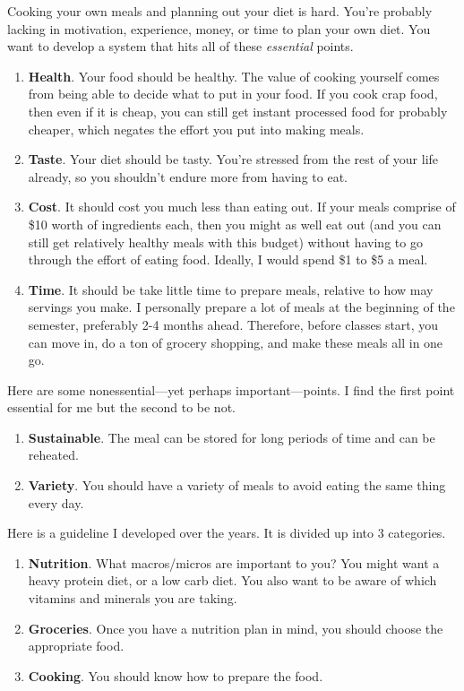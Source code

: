 Cooking your own meals and planning out your diet is hard. You're probably lacking in motivation, experience, money, or time to plan your own diet. You want to develop a system that hits all of these \textit{essential} points. 
\begin{enumerate}
  \item \textbf{Health}. Your food should be healthy. The value of cooking yourself comes from being able to decide what to put in your food. If you cook crap food, then even if it is cheap, you can still get instant processed food for probably cheaper, which negates the effort you put into making meals.  

  \item \textbf{Taste}. Your diet should be tasty. You're stressed from the rest of your life already, so you shouldn't endure more from having to eat. 


  \item \textbf{Cost}. It should cost you much less than eating out. If your meals comprise of \$10 worth of ingredients each, then you might as well eat out (and you can still get relatively healthy meals with this budget) without having to go through the effort of eating food. Ideally, I would spend \$1 to \$5 a meal. 

  \item \textbf{Time}. It should be take little time to prepare meals, relative to how may servings you make. I personally prepare a lot of meals at the beginning of the semester, preferably 2-4 months ahead. Therefore, before classes start, you can move in, do a ton of grocery shopping, and make these meals all in one go. 

\end{enumerate}
Here are some nonessential---yet perhaps important---points. I find the first point essential for me but the second to be not. 
\begin{enumerate}
  \item \textbf{Sustainable}. The meal can be stored for long periods of time and can be reheated. 
  \item \textbf{Variety}. You should have a variety of meals to avoid eating the same thing every day. 
\end{enumerate}

Here is a guideline I developed over the years. It is divided up into 3 categories. 
\begin{enumerate}
  \item \textbf{Nutrition}. What macros/micros are important to you? You might want a heavy protein diet, or a low carb diet. You also want to be aware of which vitamins and minerals you are taking.  
  \item \textbf{Groceries}. Once you have a nutrition plan in mind, you should choose the appropriate food.  
  \item \textbf{Cooking}. You should know how to prepare the food. 
\end{enumerate}

